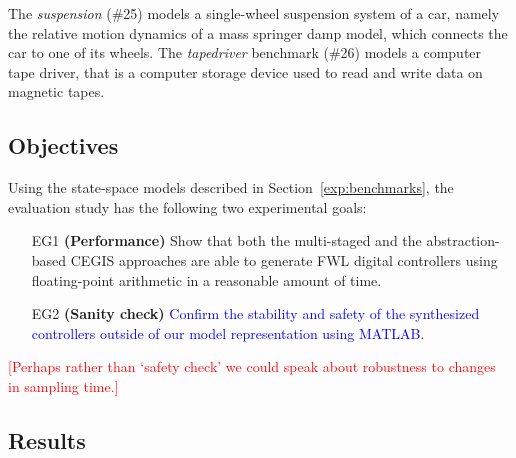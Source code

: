 \documentclass[twocolumn]{autart}    %
\renewcommand{\note}[1]{\textcolor{red}{[#1]}}
\begin{document}
The \textit{suspension} (\#25) models a single-wheel suspension system of a car, 
namely the relative motion dynamics of a mass springer damp model, which connects the car to one of its wheels.  
The \textit{tapedriver} benchmark (\#26) models a computer tape driver, 
that is a computer storage device used to read and write data on magnetic tapes. 


 
\subsection{Objectives}
\label{exp:objectives}

Using the state-space models described in Section~\ref{exp:benchmarks}, 
the evaluation study has the following two experimental goals: 

\begin{enumerate}

\item[EG1] \textbf{(Performance)} Show that both the multi-staged and the abstraction-based
CEGIS approaches are able to generate FWL digital controllers using floating-point arithmetic 
in a reasonable amount of time.

\item[EG2] \textbf{(Sanity check)} \textcolor{blue}{Confirm the stability and safety of the synthesized controllers outside 
of our model representation using MATLAB}.

\end{enumerate}

\note{Perhaps rather than `safety check' we could speak about robustness to changes in sampling time.}

\subsection{Results}
\label{exp:results}
\end{document}
